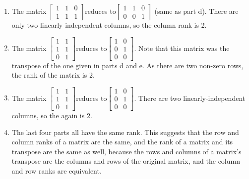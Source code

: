 \documentclass[11pt]{article}
\theoremstyle{definition}
\begin{document}
\begin{enumerate}
\begin{enumerate}
    	\item %
    	The matrix $
    	\begin{bmatrix}
		  1 & 1 & 0 \\
		  1 & 1 & 1
		 \end{bmatrix}
    	$reduces to$
    	\begin{bmatrix}
		  1 & 1 & 0 \\
		  0 & 0 & 1
		 \end{bmatrix}
		 $ (same as part d).  There are only two linearly independent columns, so the column rank is 2.

    	\item %
    	The matrix $
    	\begin{bmatrix}
		  1 & 1 \\
		  1 & 1 \\
		  0 & 1
		 \end{bmatrix}
    	$reduces to$
    	\begin{bmatrix}
		  1 & 0 \\
		  0 & 1 \\
		  0 & 0
		 \end{bmatrix}
		 $.  Note that this matrix was the transpose of the one given in parts d and e.  As there are two non-zero rows, the rank of the matrix is 2.

    	\item %
    	The matrix $
    	\begin{bmatrix}
		  1 & 1 \\
		  1 & 1 \\
		  0 & 1
		 \end{bmatrix}
    	$reduces to$
    	\begin{bmatrix}
		  1 & 0 \\
		  0 & 1 \\
		  0 & 0
		 \end{bmatrix}
		 $.  There are two linearly-independent columns, so the again is 2.

    	\item %
    	The last four parts all have the same rank.  This suggests that the row and column ranks of a matrix are the same, and the rank of a matrix and its transpose are the same as well, because the rows and columns of a matrix's transpose are the columns and rows of the original matrix, and the column and row ranks are equivalent.

    \end{enumerate}

\end{enumerate}
\end{document}
